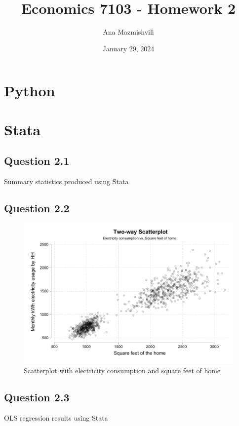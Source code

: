 \documentclass{article}
\title{Economics 7103 - Homework 2}
\author{Ana Mazmishvili}
\date{ January 29, 2024 }
\begin{document}
  
\maketitle 

\section*{Python}

\section*{Stata}

\subsection*{Question 2.1}


\begin{table}[ht]
    \centering
    
    \caption{Summary statistics produced using Stata}
    \label{tab:my_label}
\end{table}

\subsection*{Question 2.2}

\begin{figure}[ht]
    \centering
    \includegraphics[scale = 0.7]{homework 2/output/figure/scatterplot.pdf}
    \caption{Scatterplot with electricity consumption and square feet of home}
\end{figure}

\subsection*{Question 2.3}
\begin{table}[ht]
    \centering
    
    \caption{OLS regression results using Stata}
  \end{table}
\end{document}
